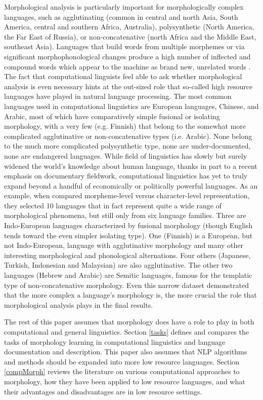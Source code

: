 \documentclass[12pt]{article}
\begin{document}
Morphological analysis is particularly important for morphologically complex languages, such as agglutinating (common in central and north Asia, South America, central and southern Africa, Australia), polysynthetic (North America, the Far East of Russia), or non-concatenative (north Africa and the Middle East, southeast Asia). Languages that build words from multiple morphemes or via significant morphophonological changes produce a high number of inflected and compound words which appear to the machine as brand new, unrelated words \cite{dreyer_discovering_2011,goldsmith_computational_2017,hammarstrom_unsupervised_2011,kann_neural_2016,ruokolainen_supervised_2013}. The fact that computational linguists feel able to ask whether morphological analysis is even necessary hints at the out-sized role that so-called high resource languages have played in natural language processing. The most common languages used in computational linguistics are European languages, Chinese, and Arabic, most of which have comparatively simple fusional or isolating morphology, with a very few (e.g. Finnish) that belong to the somewhat more complicated agglutinative or non-concatenative types (i.e. Arabic). None belong to the much more complicated polysynthetic type, none are under-documented, none are endangered languages. While field of linguistics has slowly but surely widened the world's knowledge about human language, thanks in part to a recent emphasis on documentary fieldwork, computational linguistics has yet to truly expand beyond a handful of economically or politically powerful languages. As an example, when  compared morpheme-level versus character-level representation, they selected 10 languages that in fact represent quite a wide range of morphological phenomena, but still only from six language families. Three are Indo-European languages characterized by fusional morphology (though English tends toward the even simpler isolating type). One (Finnish) is a European, but not Indo-European, language with agglutinative morphology and many other interesting morphological and phonological alternations. Four others (Japanese, Turkish, Indonesian and Malaysian) are also agglutinative. The other two languages (Hebrew and Arabic) are Semitic languages, famous for the templatic type of non-concatenative morphology. Even this narrow dataset demonstrated that the more complex a language’s morphology is, the more crucial the role that morphological analysis plays in the final results. 
 
The rest of this paper assumes that morphology does have a role to play in both computational and general linguistics. Section \ref{tasks} defines and compares the tasks of morphology learning in computational linguistics and language documentation and description. This paper also assumes that NLP algorithms and methods should be expanded into more low resource languages. Section \ref{compMorph} reviews the literature on various computational approaches to morphology, how they have been applied to low resource languages, and what their advantages and disadvantages are in low resource settings.
\end{document}
